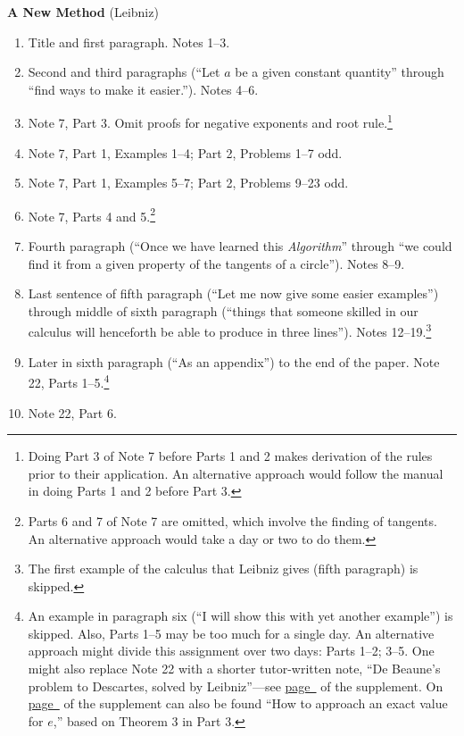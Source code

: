 \documentclass[10pt]{article}
\begin{document}
{\textbf{A New Method} (Leibniz)
\begin{enumerate}[resume*] \item Title and first paragraph.
		Notes 1--3.  \item Second and third
		paragraphs (``Let $a$ be a given constant
		quantity'' through ``find ways to make it
		easier.''). Notes 4--6.  \item Note 7, Part
		3. Omit proofs for negative exponents and
		root rule.\footnote{Doing Part 3 of Note 7
			before Parts 1 and 2 makes
			derivation of the rules prior to
			their application. An alternative
			approach would follow the manual in
			doing Parts 1 and 2 before Part 3.}
	\item Note 7, Part 1, Examples 1--4; Part 2,
		Problems 1--7 odd.  \item Note 7, Part 1,
		Examples 5--7; Part 2, Problems 9--23 odd.
	\item Note 7, Parts 4 and 5.\footnote{Parts 6 and 7
			of Note 7 are omitted, which involve
			the finding of tangents. An
			alternative approach would take a
			day or two to do them.} \item Fourth
		paragraph (``Once we have learned this
		\emph{Algorithm}'' through ``we could find
		it from a given property of the tangents of
		a circle'').  Notes 8--9.  \item Last
		sentence of fifth paragraph (``Let me now
		give some easier examples'') through middle
		of sixth paragraph (``things that someone
		skilled in our calculus will henceforth be
		able to produce in three lines''). Notes
		12--19.\footnote{The first example of the
			calculus that Leibniz gives (fifth
			paragraph) is
			skipped.} \item Later in sixth
		paragraph (``As an appendix'') to the end of
		the paper.  Note 22, Parts 1--5.\footnote{An
			example in paragraph six (``I will
			show this with yet another
			example'') is skipped. Also, Parts
			1--5 may be too much for a single
			day. An alternative approach might
			divide this assignment over two
			days: Parts 1--2; 3--5. One might
			also replace Note 22 with a shorter
		tutor-written note, ``De Beaune’s problem to
		Descartes, solved by Leibniz''---see
		\hyperref[supple.14]{page~\pageref{supple.14}}
		of the supplement. On
	\hyperref[supple.20]{page~\pageref{supple.20}} of
	the supplement can also be found ``How to approach an
	exact value for $e$,'' based on Theorem 3 in Part
	3.} \item Note
		22, Part 6.  \end{enumerate}
	 
}
\end{document}
